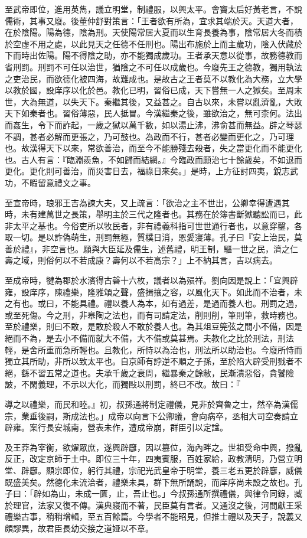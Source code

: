 \begin{pinyinscope}
至武帝即位，進用英雋，議立明堂，制禮服，以興太平。會竇太后好黃老言，不說儒術，其事又廢。後董仲舒對策言：「王者欲有所為，宜求其端於天。天道大者，在於陰陽。陽為德，陰為刑。天使陽常居大夏而以生育長養為事，陰常居大冬而積於空虛不用之處，以此見天之任德不任刑也。陽出布施於上而主歲功，陰入伏藏於下而時出佐陽。陽不得陰之助，亦不能獨成歲功。王者承天意以從事，故務德教而省刑罰。刑罰不可任以治世，猶陰之不可任以成歲也。今廢先王之德教，獨用執法之吏治民，而欲德化被四海，故難成也。是故古之王者莫不以教化為大務，立大學以教於國，設庠序以化於邑。教化已明，習俗已成，天下嘗無一人之獄矣。至周末世，大為無道，以失天下。秦繼其後，又益甚之。自古以來，未嘗以亂濟亂，大敗天下如秦者也。習俗薄惡，民人抵冒。今漢繼秦之後，雖欲治之，無可柰何。法出而姦生，令下而詐起，一歲之獄以萬千數，如以湯止沸，沸俞甚而無益。辟之琴瑟不調，甚者必解而更張之，乃可鼓也。為政而不行，甚者必變而更化之，乃可理也。故漢得天下以來，常欲善治，而至今不能勝殘去殺者，失之當更化而不能更化也。古人有言：『臨淵羨魚，不如歸而結網。』今臨政而願治七十餘歲矣，不如退而更化。更化則可善治，而災害日去，福祿日來矣。」是時，上方征討四夷，銳志武功，不暇留意禮文之事。

至宣帝時，琅邪王吉為諫大夫，又上疏言：「欲治之主不世出，公卿幸得遭遇其時，未有建萬世之長策，舉明主於三代之隆者也。其務在於簿書斷獄聽訟而已，此非太平之基也。今俗吏所以牧民者，非有禮義科指可世世通行者也，以意穿鑿，各取一切。是以詐偽萌生，刑罰無極，質樸日消，恩愛寖薄。孔子曰『安上治民，莫善於禮』，非空言也。願與大臣延及儒生，述舊禮，明王制，驅一世之民，濟之仁壽之域，則俗何以不若成康？壽何以不若高宗？」上不納其言，吉以病去。

至成帝時，犍為郡於水濱得古磬十六枚，議者以為殒祥。劉向因是說上：「宜興辟雍，設庠序，陳禮樂，隆雅頌之聲，盛揖攘之容，以風化天下。如此而不治者，未之有也。或曰，不能具禮。禮以養人為本，如有過差，是過而養人也。刑罰之過，或至死傷。今之刑，非皋陶之法也，而有司請定法，削則削，筆則筆，救時務也。至於禮樂，則曰不敢，是敢於殺人不敢於養人也。為其俎豆筦弦之間小不備，因是絕而不為，是去小不備而就大不備，大不備或莫甚焉。夫教化之比於刑法，刑法輕，是舍所重而急所輕也。且教化，所恃以為治也，刑法所以助治也。今廢所恃而獨立其所助，非所以致太平也。自京師有誖逆不順之子孫，至於陷大辟受刑戮者不絕，繇不習五常之道也。夫承千歲之衰周，繼暴秦之餘敝，民漸漬惡俗，貪饕險詖，不閑義理，不示以大化，而獨敺以刑罰，終已不改。故曰：『

導之以禮樂，而民和睦。』初，叔孫通將制定禮儀，見非於齊魯之士，然卒為漢儒宗，業垂後嗣，斯成法也。」成帝以向言下公卿議，會向病卒，丞相大司空奏請立辟雍。案行長安城南，營表未作，遭成帝崩，群臣引以定諡。

及王莽為宰衡，欲燿眾庶，遂興辟廱，因以篡位，海內畔之。世祖受命中興，撥亂反正，改定京師于土中。即位三十年，四夷賓服，百姓家給，政教清明，乃營立明堂、辟廱。顯宗即位，躬行其禮，宗祀光武皇帝于明堂，養三老五更於辟廱，威儀既盛美矣。然德化未流洽者，禮樂未具，群下無所誦說，而庠序尚未設之故也。孔子曰：「辟如為山，未成一匱，止，吾止也。」今叔孫通所撰禮儀，與律令同錄，臧於理官，法家又復不傳。漢典寢而不著，民臣莫有言者。又通沒之後，河間獻王采禮樂古事，稍稍增輯，至五百餘篇。今學者不能昭見，但推士禮以及天子，說義又頗謬異，故君臣長幼交接之道娅以不章。


\end{pinyinscope}

